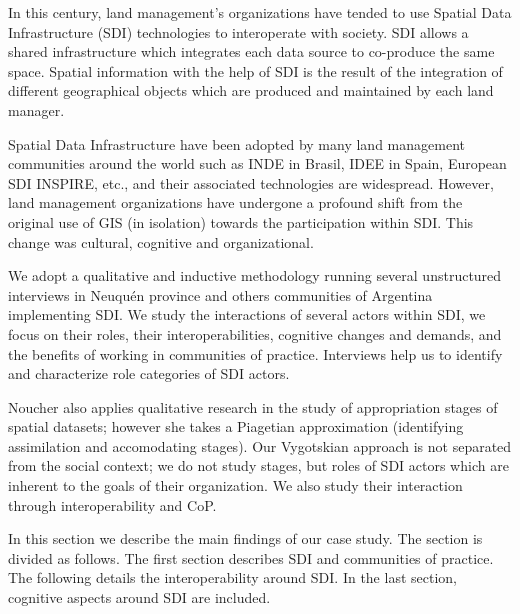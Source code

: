 \documentclass[10pt,twocolumn,ieeetran]{article}
\begin{document}





In this century, land management's organizations have tended to use Spatial Data Infrastructure (SDI) technologies to interoperate with  society. SDI allows a shared infrastructure which integrates each data source to co-produce the same space. Spatial information with the help of SDI is the result of the integration of different geographical objects which are produced and maintained by each land manager.

Spatial Data Infrastructure have been adopted by many land management communities around the world such as   INDE in Brasil, IDEE in Spain, European SDI INSPIRE, etc., and their associated technologies are widespread. However, land management organizations have undergone a profound shift from the original use of GIS (in isolation) towards the participation within SDI.
This change was cultural, cognitive and organizational.

We adopt a qualitative and inductive methodology running several unstructured interviews in Neuqu\' en province and others communities of Argentina implementing SDI. We study the interactions of several actors within SDI, we focus on their roles, their interoperabilities, cognitive changes and demands, and the benefits of working in communities of practice.  Interviews help us to identify and characterize role
categories of SDI actors.


Noucher \cite{Noucher1} also applies qualitative research in the study of appropriation stages of spatial datasets; however she takes a Piagetian approximation (identifying assimilation and accomodating stages). 
Our Vygotskian approach is not separated from the social context; we do not study stages, but roles of SDI actors which are inherent to the goals of their organization. We also study their interaction through interoperability and CoP.


In this section we describe the main findings of our case study. The section is divided as follows. The first section describes SDI and communities of practice. The following details the interoperability around SDI. In the last section, cognitive aspects around SDI are included.
 
\end{document}
